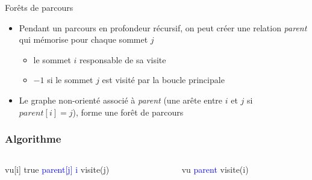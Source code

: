 \begin{frame}{Forêts de parcours}
    \begin{itemize}
        \item Pendant un parcours en profondeur récursif, on peut créer une relation \emph{parent} qui mémorise pour chaque sommet $j$ 
        \begin{itemize}
            \item le sommet $i$ responsable de sa visite 
            \item $-1$ si le sommet $j$ est visité par la boucle principale 
        \end{itemize}
        \item Le graphe non-orienté associé à \emph{parent} (une arête entre $i$ et $j$ si $parent[i]=j$), forme une forêt de parcours 
    \end{itemize}
\end{frame}



\begin{frame}[fragile]
\frametitle{Algorithme}
    \begin{columns}
        \begin{column}{.5\textwidth}
            \begin{algorithmic}[1]
                \State vu[i] \gets true
                        \State \textcolor{blue}{parent[j] \gets i}
                        \State visite(j)
                    \EndIf
                \EndFor
                \EndFunction
            \end{algorithmic}
        \end{column}
        \begin{column}{.5\textwidth}
            \begin{algorithmic}[1]
                \State vu 
                \State \textcolor{blue}{parent \gets [$-1$,...,$-1$]}
                    \State visite(i)
                    \EndIf
                \EndFor
                \end{algorithmic}            
        \end{column}
    \end{columns}    
\end{frame}



